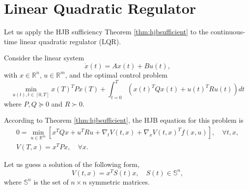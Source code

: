 \documentclass[
]{book}
\theoremstyle{definition}
\theoremstyle{definition}
\theoremstyle{definition}
\theoremstyle{definition}
\theoremstyle{remark}
\begin{document}
\hypertarget{linear-quadratic-regulator}{%
\section{Linear Quadratic Regulator}\label{linear-quadratic-regulator}}

Let us apply the HJB sufficiency Theorem \ref{thm:hjbsufficient} to the continuous-time linear quadratic regulator (LQR).

Consider the linear system
\[
\dot{x}(t) = A x(t) + B u(t),
\]
with \(x \in \mathbb{R}^n\), \(u \in \mathbb{R}^m\), and the optimal control problem
\[
\min_{u(t),t\in [0,T]} x(T)^T P x(T) + \int_{t=0}^T (x(t)^T Q x(t) + u(t)^T R u(t)) dt 
\]
where \(P,Q\succeq 0\) and \(R \succ 0\).

According to Theorem \ref{thm:hjbsufficient}, the HJB equation for this problem is
\begin{equation}
\begin{split}
0 = \min_{u \in \mathbb{R}^m } \left[ x^T Q x + u^T R u + \nabla_t V(t,x) + \nabla_x V(t,x)^T f(x,u) \right], \quad \forall t,x, \\
V(T,x) = x^T P x, \quad \forall x.
\end{split}
\label{eq:hjb-finite-horizon-lqr}
\end{equation}

Let us guess a solution of the following form,
\[
V(t,x) = x^T S(t) x, \quad S(t) \in \mathbb{S}^n,
\]
where \(\mathbb{S}^n\) is the set of \(n \times n\) symmetric matrices.
\end{document}
